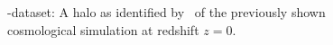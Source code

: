 \begin{frame}
\begin{figure}[htbp!]
		\caption{\footnotesize
			\cosmo-dataset: A halo as identified by \phew\ of the previously shown cosmological simulation at redshift $z = 0$. 
		}%
		\label{fig:dice_sub_origin}
		\endminipage\hspace*{\fill} 
	\end{figure}
\end{frame}



%	
%	
